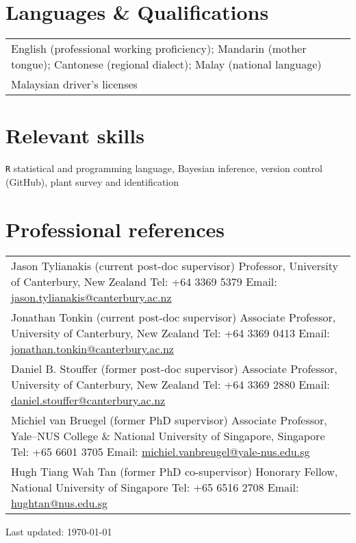 \documentclass[a4paper]{article}
\def\footerlink{}
\begin{document}
\section*{Languages \& Qualifications}
\begin{tabular}{p{\linewidth}}
English (professional working proficiency); Mandarin (mother tongue); Cantonese (regional dialect); Malay (national language) \\
Malaysian driver's licenses \\
\end{tabular}


\section*{Relevant skills}
\texttt{R} statistical and programming language, Bayesian inference, version control (GitHub), plant survey and identification

\section*{Professional references}
\begin{tabular}{p{\linewidth}}
Jason Tylianakis (current post-doc supervisor) \newline
Professor, University of Canterbury, New Zealand \newline 
Tel: +64 3369 5379 \newline 
Email: \url{jason.tylianakis@canterbury.ac.nz} \\

Jonathan Tonkin (current post-doc supervisor) \newline 
Associate Professor, University of Canterbury, New Zealand \newline 
Tel: +64 3369 0413 \newline 
Email: \url{jonathan.tonkin@canterbury.ac.nz} \\

Daniel B. Stouffer (former post-doc supervisor) \newline 
Associate Professor, University of Canterbury, New Zealand \newline 
Tel: +64 3369 2880 \newline 
Email: \url{daniel.stouffer@canterbury.ac.nz} \\

Michiel van Bruegel (former PhD supervisor) \newline 
Associate Professor, Yale--NUS College \& National University of Singapore, Singapore \newline 
Tel: +65 6601 3705 \newline 
Email: \url{michiel.vanbreugel@yale-nus.edu.sg} \\

Hugh Tiang Wah Tan (former PhD co-supervisor) \newline 
Honorary Fellow, National University of Singapore \newline
Tel: +65 6516 2708 \newline 
Email: \url{hughtan@nus.edu.sg} \\

\end{tabular}

\vfill
\begin{center}
  \begin{footnotesize}
    Last updated: \today \\
    \href{\footerlink}{\texttt{\footerlink}}
  \end{footnotesize}
\end{center}
\end{document}

